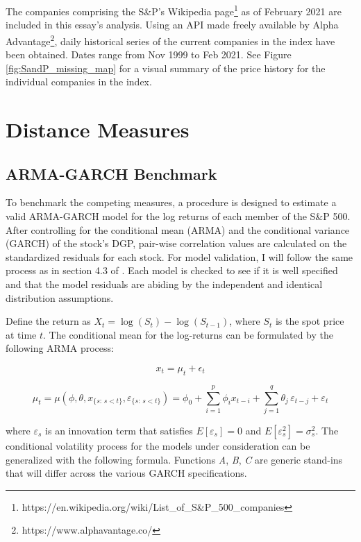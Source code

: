 \documentclass[12pt]{article}
\begin{document}
The companies comprising the S\&P's Wikipedia page\footnote{https://en.wikipedia.org/wiki/List\_of\_S\&P\_500\_companies} as of February 2021 are included in this essay's analysis. Using an API made freely available by Alpha Advantage\footnote{https://www.alphavantage.co/}, daily historical series of the current companies in the index have been obtained. Dates range from Nov 1999 to Feb 2021. See Figure \ref{fig:SandP_missing_map} for a visual summary of the price history for the individual companies in the index.

\section{Distance Measures}

\subsection{ARMA-GARCH Benchmark} \label{sec:ARMAGARCH-benchmark}

To benchmark the competing measures, a procedure is designed to estimate a valid ARMA-GARCH model for the log returns of each member of the S\&P 500. After controlling for the conditional mean (ARMA) and the conditional variance (GARCH) of the stock's DGP, pair-wise correlation values are calculated on the standardized residuals for each stock. For model validation, I will follow the same process as in section 4.3 of \cite{DowiakTV-COP}. Each model is checked to see if it is well specified and that the model residuals are abiding by the independent and identical distribution assumptions.

Define the return as $X_{t} = \log \left(S_{t}\right) - \log\left(S_{t-1}\right)$, where $S_{t}$ is the spot price at time $t$. The conditional mean for the log-returns can be formulated by the following ARMA process:

\begin{equation} \label{eqn:marginalModel}
    x_{t} = \mu_{t} + \epsilon_{t}
\end{equation}

\begin{equation}
    \mu_{t} = \mu(\phi, \theta, x_{\{s:\, s < t\}}, \varepsilon_{\{s:\, s < t\}}) = \phi_{0} + \sum_{i=1}^{p} \phi_{i} x_{t-i} + \sum_{j=1}^{q} \theta_{j} \, \varepsilon_{t - j} + \varepsilon_{t}
\end{equation}

where $\varepsilon_{s}$ is an innovation term that satisfies $E[\varepsilon_{s}] = 0$ and $E[\varepsilon^{2}_{s}] = \sigma^{2}_{s}$. The conditional volatility process for the models under consideration can be generalized with the following formula. Functions \emph{A}, \emph{B}, \emph{C} are generic stand-ins that will differ across the various GARCH specifications.
\end{document}
